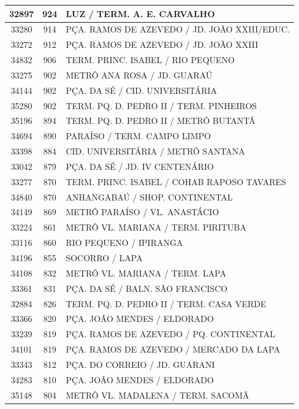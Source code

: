 \documentclass[
	12pt,				%
	oneside,			%
	a4paper,			%
	english,			%
	brazil				%
	]{abntex2ppgsi}
\begin{document}
{{{\begin{apendicesenv}
\begin{longtable}{c|c|p{7cm}}
 \hline 
32897 &	924 &	LUZ / TERM. A. E. CARVALHO \\ 
 \hline 
33280 &	914 &	PÇA. RAMOS DE AZEVEDO / JD. JOÃO XXIII/EDUC. \\ 
 \hline 
33272 &	912 &	PÇA. RAMOS DE AZEVEDO / JD. JOÃO XXIII \\ 
 \hline 
34832 &	906 &	TERM. PRINC. ISABEL / RIO PEQUENO \\ 
 \hline 
33275 &	902 &	METRÔ ANA ROSA / JD. GUARAÚ \\ 
 \hline 
34144 &	902 &	PÇA. DA SÉ / CID. UNIVERSITÁRIA \\ 
 \hline 
35280 &	902 &	TERM. PQ. D. PEDRO II / TERM. PINHEIROS \\ 
 \hline 
35196 &	894 &	TERM. PQ. D. PEDRO II / METRÔ BUTANTÃ \\ 
 \hline 
34694 &	890 &	PARAÍSO / TERM. CAMPO LIMPO \\ 
 \hline 
33398 &	884 &	CID. UNIVERSITÁRIA / METRÔ SANTANA \\ 
 \hline 
33042 &	879 &	PÇA. DA SÉ / JD. IV CENTENÁRIO \\ 
 \hline 
33277 &	870 &	TERM. PRINC. ISABEL / COHAB RAPOSO TAVARES \\ 
 \hline 
34840 &	870 &	ANHANGABAÚ / SHOP. CONTINENTAL \\ 
 \hline 
34149 &	869 &	METRÔ PARAÍSO / VL. ANASTÁCIO \\ 
 \hline 
33224 &	861 &	METRÔ VL. MARIANA / TERM. PIRITUBA \\ 
 \hline 
33116 &	860 &	RIO PEQUENO / IPIRANGA \\ 
 \hline 
34196 &	855 &	SOCORRO / LAPA \\ 
 \hline 
34108 &	832 &	METRÔ VL. MARIANA / TERM. LAPA \\ 
 \hline 
33361 &	831 &	PÇA. DA SÉ / BALN. SÃO FRANCISCO \\ 
 \hline 
32884 &	826 &	TERM. PQ. D. PEDRO II / TERM. CASA VERDE \\ 
 \hline 
33366 &	820 &	PÇA. JOÃO MENDES / ELDORADO \\ 
 \hline 
33239 &	819 &	PÇA. RAMOS DE AZEVEDO / PQ. CONTINENTAL \\ 
 \hline 
34101 &	819 &	PÇA. RAMOS DE AZEVEDO / MERCADO DA LAPA \\ 
 \hline 
33343 &	812 &	PÇA. DO CORREIO / JD. GUARANI \\ 
 \hline 
34283 &	810 &	PÇA. JOÃO MENDES / ELDORADO \\ 
 \hline 
35148 &	804 &	METRÔ VL. MADALENA / TERM. SACOMÃ \\ 

\end{longtable}
\end{apendicesenv}}}}
\end{document}
